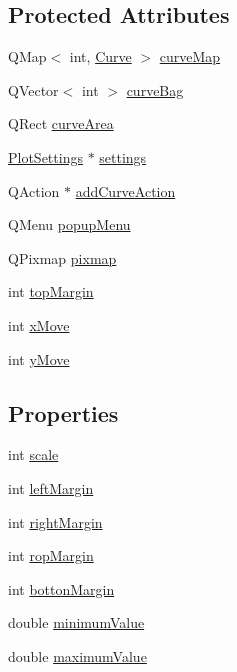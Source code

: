 \subsection*{Protected Attributes}
\begin{DoxyCompactItemize}
\item 
Q\+Map$<$ int, \hyperlink{class_curve}{Curve} $>$ \hyperlink{class_q_abstract_plotter_a4d4f8fc4f2672d09cab0271a02968d59}{curve\+Map}
\item 
Q\+Vector$<$ int $>$ \hyperlink{class_q_abstract_plotter_a1b5881e413b257f306964f59415113c3}{curve\+Bag}
\item 
Q\+Rect \hyperlink{class_q_abstract_plotter_a2698abe37c976f5c77c8e26693ff2ae5}{curve\+Area}
\item 
\hyperlink{class_plot_settings}{Plot\+Settings} $\ast$ \hyperlink{class_q_abstract_plotter_af070c9bf7a0beb0100ccd84f1ace901d}{settings}
\item 
Q\+Action $\ast$ \hyperlink{class_q_abstract_plotter_aead5ab3bfcc56d03d12577dd88806cb6}{add\+Curve\+Action}
\item 
Q\+Menu \hyperlink{class_q_abstract_plotter_abcadf5621577060aca59f8afeba4b158}{popup\+Menu}
\item 
Q\+Pixmap \hyperlink{class_q_abstract_plotter_a2d7f15962892242af9ed0333272a4d11}{pixmap}
\item 
int \hyperlink{class_q_abstract_plotter_ac7e8628fcd1a276c25cb9990a54d8d7d}{top\+Margin}
\item 
int \hyperlink{class_q_abstract_plotter_ab7cce60f558e059a4ebd5b36fab03f19}{x\+Move}
\item 
int \hyperlink{class_q_abstract_plotter_ac224c5f341067ea2232a805ed688dcfd}{y\+Move}
\end{DoxyCompactItemize}
\subsection*{Properties}
\begin{DoxyCompactItemize}
\item 
int \hyperlink{class_q_abstract_plotter_aa01fe966220b24f5d63de9fa46e7b53d}{scale}
\item 
int \hyperlink{class_q_abstract_plotter_abc58221e36fd9351998fb998a76de8dd}{left\+Margin}
\item 
int \hyperlink{class_q_abstract_plotter_abad2dc2209000f2b19ac7a25dfd1cfb7}{right\+Margin}
\item 
int \hyperlink{class_q_abstract_plotter_ae56e010438b633a7cdf33eb209119f2c}{rop\+Margin}
\item 
int \hyperlink{class_q_abstract_plotter_abdc7187a3e5c356f116fd768c93a8029}{botton\+Margin}
\item 
double \hyperlink{class_q_abstract_plotter_a212efe72e136b731ca4156af54e179a1}{minimum\+Value}
\item 
double \hyperlink{class_q_abstract_plotter_ada42f078142e1d9bd4edf734937eba7e}{maximum\+Value}
\end{DoxyCompactItemize}


